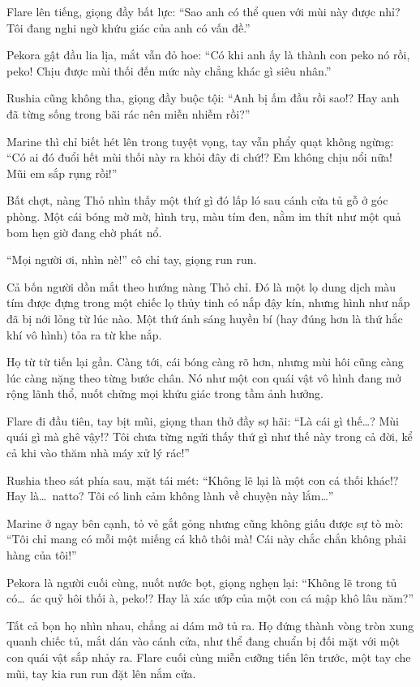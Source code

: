 \documentclass[../main.tex]{subfiles}
\begin{document}
Flare lên tiếng, giọng đầy bất lực: ``Sao anh có thể quen với mùi này được nhỉ? Tôi đang nghi ngờ khứu giác của anh có vấn đề.''

Pekora gật đầu lia lịa, mắt vẫn đỏ hoe: ``Có khi anh ấy là thành con peko nó rồi, peko! Chịu được mùi thối đến mức này chẳng khác gì siêu nhân.''

Rushia cũng không tha, giọng đầy buộc tội: ``Anh bị ấm đầu rồi sao!? Hay anh đã từng sống trong bãi rác nên miễn nhiễm rồi?''

Marine thì chỉ biết hét lên trong tuyệt vọng, tay vẫn phẩy quạt không ngừng: ``Có ai đó đuổi hết mùi thối này ra khỏi đây đi chứ!? Em không chịu nổi nữa! Mũi em sắp rụng rồi!''

Bất chợt, nàng Thỏ nhìn thấy một thứ gì đó lấp ló sau cánh cửa tủ gỗ ở góc phòng. Một cái bóng mờ mờ, hình trụ, màu tím đen, nằm im thít như một quả bom hẹn giờ đang chờ phát nổ.

``Mọi người ơi, nhìn nè!'' cô chỉ tay, giọng run run.

Cả bốn người dồn mắt theo hướng nàng Thỏ chỉ. Đó là một lọ dung dịch màu tím được đựng trong một chiếc lọ thủy tinh có nắp đậy kín, nhưng hình như nắp đã bị nới lỏng từ lúc nào. Một thứ ánh sáng huyền bí (hay đúng hơn là thứ hắc khí vô hình) tỏa ra từ khe nắp.

Họ từ từ tiến lại gần. Càng tới, cái bóng càng rõ hơn, nhưng mùi hôi cũng càng lúc càng nặng theo từng bước chân. Nó như một con quái vật vô hình đang mở rộng lãnh thổ, nuốt chửng mọi khứu giác trong tầm ảnh hưởng.

Flare đi đầu tiên, tay bịt mũi, giọng than thở đầy sợ hãi: ``Là cái gì thế\dots? Mùi quái gì mà ghê vậy!? Tôi chưa từng ngửi thấy thứ gì như thế này trong cả đời, kể cả khi vào thăm nhà máy xử lý rác!''

Rushia theo sát phía sau, mặt tái mét: ``Không lẽ lại là một con cá thối khác!? Hay là\dots\ natto? Tôi có linh cảm không lành về chuyện này lắm\dots''

Marine ở ngay bên cạnh, tỏ vẻ gắt gỏng nhưng cũng không giấu được sự tò mò: ``Tôi chỉ mang có mỗi một miếng cá khô thôi mà! Cái này chắc chắn không phải hàng của tôi!''

Pekora là người cuối cùng, nuốt nước bọt, giọng nghẹn lại: ``Không lẽ trong tủ có\dots\ ác quỷ hôi thối à, peko!? Hay là xác ướp của một con cá mập khô lâu năm?''

Tất cả bọn họ nhìn nhau, chẳng ai dám mở tủ ra. Họ đứng thành vòng tròn xung quanh chiếc tủ, mắt dán vào cánh cửa, như thể đang chuẩn bị đối mặt với một con quái vật sắp nhảy ra. Flare cuối cùng miễn cưỡng tiến lên trước, một tay che mũi, tay kia run run đặt lên nắm cửa.
\end{document}
